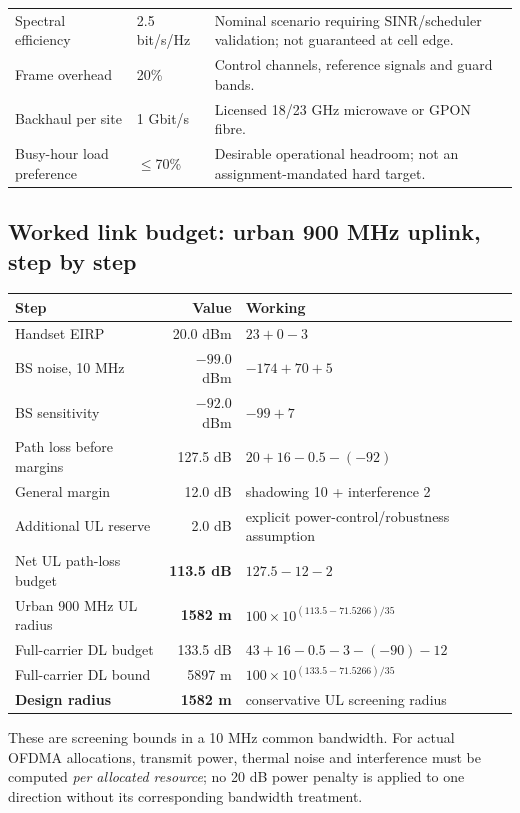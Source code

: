 \documentclass[9pt,a4paper]{extarticle}
\begin{document}
\begin{table}[H]
\begin{tabularx}{\textwidth}{@{}p{3.5cm}p{1.9cm}X@{}}
Spectral efficiency & 2.5 bit/s/Hz & Nominal scenario requiring SINR/scheduler validation; not guaranteed at cell edge. \\
Frame overhead & 20\% & Control channels, reference signals and guard bands. \\
Backhaul per site & 1 Gbit/s & Licensed 18/23 GHz microwave or GPON fibre. \\
Busy-hour load preference & $\leq$70\% & Desirable operational headroom; not an assignment-mandated hard target. \\
\bottomrule
\end{tabularx}
\end{table}

\subsection{Worked link budget: urban 900 MHz uplink, step by step}
\begin{center}\small
\begin{tabular}{@{}lrl@{}}\toprule
\textbf{Step} & \textbf{Value} & \textbf{Working} \\ \midrule
Handset EIRP & 20.0 dBm & $23+0-3$ \\
BS noise, 10 MHz & $-99.0$ dBm & $-174+70+5$ \\
BS sensitivity & $-92.0$ dBm & $-99+7$ \\
Path loss before margins & 127.5 dB & $20+16-0.5-(-92)$ \\
General margin & 12.0 dB & shadowing 10 + interference 2 \\
Additional UL reserve & 2.0 dB & explicit power-control/robustness assumption \\
Net UL path-loss budget & \textbf{113.5 dB} & $127.5-12-2$ \\
Urban 900 MHz UL radius & \textbf{1582 m} & $100\times10^{(113.5-71.5266)/35}$ \\
Full-carrier DL budget & 133.5 dB & $43+16-0.5-3-(-90)-12$ \\
Full-carrier DL bound & 5897 m & $100\times10^{(133.5-71.5266)/35}$ \\
\textbf{Design radius} & \textbf{1582 m} & conservative UL screening radius \\ \bottomrule
\end{tabular}
\end{center}
These are screening bounds in a 10 MHz common bandwidth. For actual
OFDMA allocations, transmit power, thermal noise and interference must be
computed \emph{per allocated resource}; no 20 dB power penalty is applied to
one direction without its corresponding bandwidth treatment.
\end{document}
